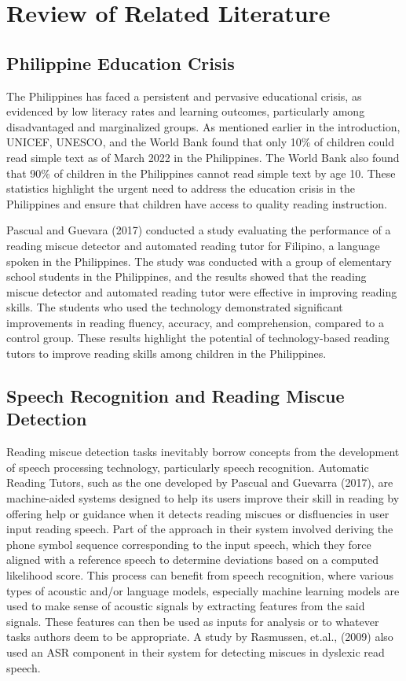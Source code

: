 \chapter{Review of Related Literature}
\label{sec:relatedlit}

\section{Philippine Education Crisis}
The Philippines has faced a persistent and pervasive educational crisis, as evidenced by low literacy rates and learning outcomes, particularly among disadvantaged and marginalized groups. As mentioned earlier in the introduction, UNICEF, UNESCO, and the World Bank found that only 10\% of children could read simple text as of March 2022 in the Philippines. The World Bank also found that 90\% of children in the Philippines cannot read simple text by age 10. These statistics highlight the urgent need to address the education crisis in the Philippines and ensure that children have access to quality reading instruction.

Pascual and Guevara (2017) conducted a study evaluating the performance of a reading miscue detector and automated reading tutor for Filipino, a language spoken in the Philippines. The study was conducted with a group of elementary school students in the Philippines, and the results showed that the reading miscue detector and automated reading tutor were effective in improving reading skills. The students who used the technology demonstrated significant improvements in reading fluency, accuracy, and comprehension, compared to a control group. These results highlight the potential of technology-based reading tutors to improve reading skills among children in the Philippines.


\section{Speech Recognition and Reading Miscue Detection}
Reading miscue detection tasks inevitably borrow concepts from the development of speech processing technology, particularly speech recognition. Automatic Reading Tutors, such as the one developed by Pascual and Guevarra (2017), are machine-aided systems designed to help its users improve their skill in reading by offering help or guidance when it detects reading miscues or disfluencies in user input reading speech. Part of the approach in their system involved deriving the phone symbol sequence corresponding to the input speech, which they force aligned with a reference speech to determine deviations based on a computed likelihood score. This process can benefit from speech recognition, where various types of acoustic and/or language models, especially machine learning models are used to make sense of acoustic signals by extracting features from the said signals. These features can then be used as inputs for analysis or to whatever tasks authors deem to be appropriate. A study by Rasmussen, et.al., (2009) also used an ASR component in their system for detecting miscues in dyslexic read speech.

